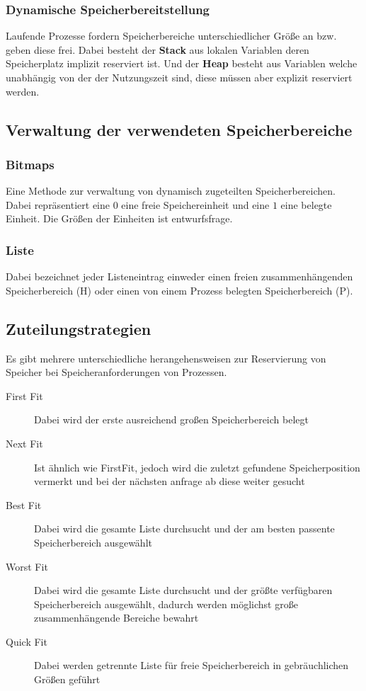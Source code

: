 \documentclass[10pt,a4paper]{article}
\begin{document}
\begin{multicols*}{4}
\subsubsection{Dynamische Speicherbereitstellung}
Laufende Prozesse fordern Speicherbereiche unterschiedlicher Größe an bzw. geben diese frei. Dabei besteht der
\textbf{Stack} aus lokalen Variablen deren Speicherplatz implizit reserviert ist. Und der \textbf{Heap} besteht aus
Variablen welche unabhängig von der der Nutzungszeit sind, diese müssen aber explizit reserviert werden.

\subsection{Verwaltung der verwendeten Speicherbereiche}
\subsubsection*{Bitmaps}
Eine Methode zur verwaltung von dynamisch zugeteilten Speicherbereichen. Dabei repräsentiert eine \(0\) eine freie
Speichereinheit und eine \(1\) eine belegte Einheit. Die Größen der Einheiten ist entwurfsfrage.

\subsubsection*{Liste}
Dabei bezeichnet jeder Listeneintrag einweder einen freien zusammenhängenden Speicherbereich (H) oder einen von einem
Prozess belegten Speicherbereich (P).

\subsection{Zuteilungstrategien}
Es gibt mehrere unterschiedliche herangehensweisen zur Reservierung von Speicher bei Speicheranforderungen von
Prozessen.

\begin{description}
	\item[First Fit] Dabei wird der erste ausreichend großen Speicherbereich belegt
	\item[Next Fit] Ist ähnlich wie FirstFit, jedoch wird die zuletzt gefundene Speicherposition vermerkt und bei der
	      nächsten anfrage ab diese weiter gesucht
	\item[Best Fit] Dabei wird die gesamte Liste durchsucht und der am besten passente Speicherbereich ausgewählt
	\item[Worst Fit] Dabei wird die gesamte Liste durchsucht und der größte verfügbaren Speicherbereich ausgewählt,
	      dadurch werden möglichst große zusammenhängende Bereiche bewahrt
	\item[Quick Fit] Dabei werden getrennte Liste für freie Speicherbereich in gebräuchlichen Größen geführt
\end{description}


\end{multicols*}
\end{document}
